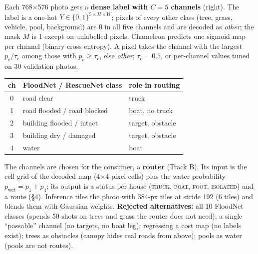 \documentclass[10pt]{article}
\newcommand{\sect}[1]{\par\vspace{5pt}{\large\bfseries #1}\par\nobreak\vspace{1pt}\nobreak}
\begin{document}
\sect{2\quad Formulation as structured prediction}
\begin{minipage}[t]{0.52\textwidth}\vspace{0pt}
Each 768$\times$576 photo gets a \textbf{dense label with $C=5$ channels} (right). The label is a one-hot
$Y\in\{0,1\}^{5\times H\times W}$; pixels of every other class (tree, grass, vehicle, pool, background) are 0 in all five
channels and are decoded as \emph{other}; the mask $M$ is 1 except on unlabelled pixels. Chameleon predicts one sigmoid
map per channel (binary cross-entropy). A pixel takes the channel with the largest $p_c/\tau_c$ among those with
$p_c\ge\tau_c$, else \emph{other}; $\tau_c=0.5$, or per-channel values tuned on 30 validation photos.
\end{minipage}\hfill
\begin{minipage}[t]{0.45\textwidth}\vspace{0pt}\small
\begin{tabular}{@{}cll@{}}\toprule
ch & FloodNet / RescueNet class & role in routing\\\midrule
0 & road clear & truck\\
1 & road flooded / road blocked & boat, no truck\\
2 & building flooded / intact & target, obstacle\\
3 & building dry / damaged & target, obstacle\\
4 & water & boat\\\bottomrule
\end{tabular}
\end{minipage}
\vspace{2pt}

The channels are chosen for the consumer, a \textbf{router} (Track B). Its input is the cell grid of the decoded map
(4$\times$4-pixel cells) plus the water probability $p_\text{wet}=p_1+p_4$; its output is a status per house
(\textsc{truck}, \textsc{boat}, \textsc{foot}, \textsc{isolated}) and a route (\S4). Inference tiles the photo with
384-px tiles at stride 192 (6 tiles) and blends them with Gaussian weights. \textbf{Rejected alternatives:} all 10
FloodNet classes (spends 50 shots on trees and grass the router does not need); a single ``passable'' channel (no
targets, no boat leg); regressing a cost map (no labels exist); trees as obstacles (canopy hides real roads from
above); pools as water (pools are not routes).
\end{document}
